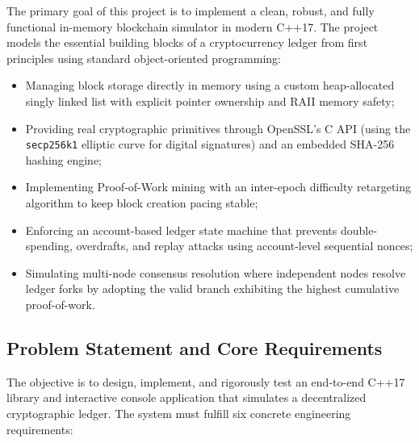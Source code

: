\documentclass[11pt,a4paper]{report}
\begin{document}
The primary goal of this project is to implement a clean, robust, and fully functional in-memory blockchain simulator in modern C++17. The project models the essential building blocks of a cryptocurrency ledger from first principles using standard object-oriented programming:
\begin{itemize}
    \item Managing block storage directly in memory using a custom heap-allocated singly linked list with explicit pointer ownership and RAII memory safety;
    \item Providing real cryptographic primitives through OpenSSL's C API (using the \texttt{secp256k1} elliptic curve for digital signatures) and an embedded SHA-256 hashing engine;
    \item Implementing Proof-of-Work mining with an inter-epoch difficulty retargeting algorithm to keep block creation pacing stable;
    \item Enforcing an account-based ledger state machine that prevents double-spending, overdrafts, and replay attacks using account-level sequential nonces;
    \item Simulating multi-node consensus resolution where independent nodes resolve ledger forks by adopting the valid branch exhibiting the highest cumulative proof-of-work.
\end{itemize}

\subsection*{Problem Statement and Core Requirements}

The objective is to design, implement, and rigorously test an end-to-end C++17 library and interactive console application that simulates a decentralized cryptographic ledger. The system must fulfill six concrete engineering requirements:
\end{document}
